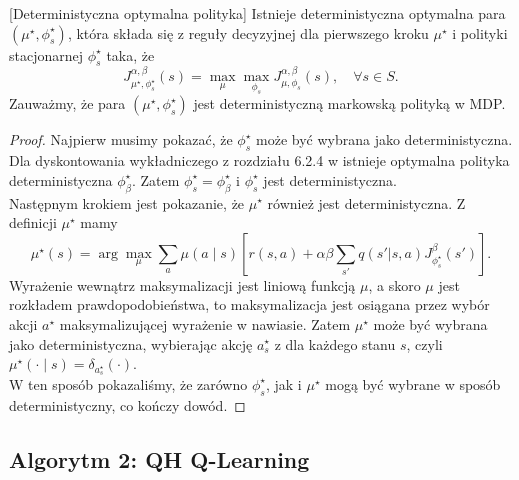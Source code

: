 \begin{theorem}\cite{eshwar2025}[Deterministyczna optymalna polityka]
\label{thm:deterministic-optimal}
Istnieje deterministyczna optymalna para $(\mu^\star, \phi_s^\star)$, która składa się z reguły decyzyjnej dla pierwszego kroku $\mu^\star$ i polityki stacjonarnej $\phi_s^\star$ taka, że
\begin{equation}
J^{\alpha, \beta}_{\mu^\star, \phi_s^\star}(s) = \max_{\mu} \max_{\phi_s} J^{\alpha, \beta}_{\mu, \phi_s}(s), \quad \forall s \in S.
\end{equation}
Zauważmy, że para $(\mu^\star, \phi_s^\star)$ jest deterministyczną markowską polityką w MDP.
\end{theorem}
\begin{proof}
Najpierw musimy pokazać, że $\phi_s^\star$ może być wybrana jako deterministyczna. Dla dyskontowania wykładniczego z rozdziału 6.2.4 w \cite{puterman2014} istnieje optymalna polityka deterministyczna $\phi_\beta^\star$. Zatem $\phi_s^\star = \phi_\beta^\star$ i $\phi_s^\star$ jest deterministyczna. \\
Następnym krokiem jest pokazanie, że $\mu^\star$ również jest deterministyczna. Z definicji $\mu^\star$ mamy
\[\mu^\star(s) = \arg\max_{\mu}\sum\limits_{a}\mu(a\mid s) \left[ r(s, a) + \alpha \beta \sum_{s'} q(s'|s, a) J^{\beta}_{\phi^\star_s}(s') \right].\]
Wyrażenie wewnątrz maksymalizacji jest liniową funkcją $\mu$, a skoro $\mu$ jest rozkładem prawdopodobieństwa, to maksymalizacja jest osiągana przez wybór akcji $a^\star$ maksymalizującej wyrażenie w nawiasie. Zatem $\mu^\star$ może być wybrana jako deterministyczna, wybierając akcję $a^\star_s$ z dla każdego stanu $s$, czyli $\mu^\star(\cdot \mid s) = \delta_{a^\star_s}(\cdot).$\\
W ten sposób pokazaliśmy, że zarówno $\phi_s^\star$, jak i $\mu^\star$ mogą być wybrane w sposób deterministyczny, co kończy dowód.
\end{proof}

\subsection{Algorytm 2: QH Q-Learning}

